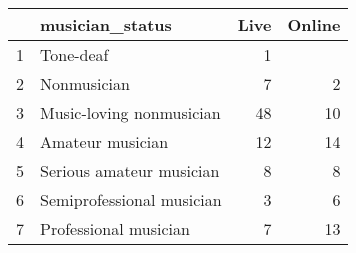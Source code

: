 \begin{table}[ht]
\centering
\begin{tabular}{rlrr}
  \hline
 & musician\_status & Live & Online \\ 
  \hline
1 & Tone-deaf &   1 &  \\ 
  2 & Nonmusician &   7 &   2 \\ 
  3 & Music-loving nonmusician &  48 &  10 \\ 
  4 & Amateur musician &  12 &  14 \\ 
  5 & Serious amateur musician &   8 &   8 \\ 
  6 & Semiprofessional musician &   3 &   6 \\ 
  7 & Professional musician &   7 &  13 \\ 
   \hline
\end{tabular}
\end{table}
